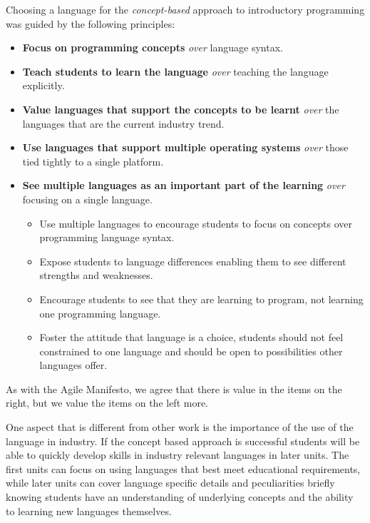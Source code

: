 Choosing a language for the \emph{concept-based} approach to introductory programming was guided by the following principles:
\begin{itemize}[nolistsep,noitemsep]
	\item \textbf{Focus on programming concepts} \emph{over} language syntax.
	\item \textbf{Teach students to learn the language} \emph{over} teaching the language explicitly.
	\item \textbf{Value languages that support the concepts to be learnt} \emph{over} the languages that are the current industry trend.
	\item \textbf{Use languages that support multiple operating systems} \emph{over} those tied tightly to a single platform. 
	\item \textbf{See multiple languages as an important part of the learning} \emph{over} focusing on a single language.
	\begin{itemize}
		\item Use multiple languages to encourage students to focus on concepts over programming language syntax.
		\item Expose students to language differences enabling them to see different strengths and weaknesses. 
		\item Encourage students to see that they are learning to program, not learning one programming language.
		\item Foster the attitude that language is a choice, students should not feel constrained to one language and should be open to possibilities other languages offer.
	\end{itemize}
\end{itemize}

As with the Agile Manifesto, we agree that there is value in the items on the right, but we value the items on the left more.

One aspect that is different from other work is the importance of the use of the language in industry. If the concept based approach is successful students will be able to quickly develop skills in industry relevant languages in later units. The first units can focus on using languages that best meet educational requirements, while later units can cover language specific details and peculiarities briefly knowing students have an understanding of underlying concepts and the ability to learning new languages themselves. 

